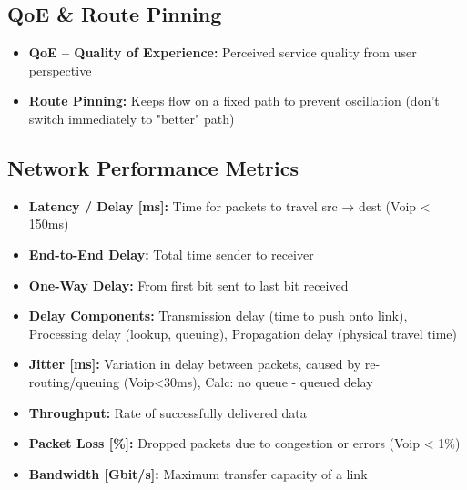 \begin{multicols*}{5}
		\subsection{QoE \& Route Pinning}
		\begin{itemize}
			\item \textbf{QoE – Quality of Experience:} Perceived service quality from user perspective
			\item \textbf{Route Pinning:} Keeps flow on a fixed path to prevent oscillation (don’t switch immediately to "better" path)
		\end{itemize}
		
		\subsection{Network Performance Metrics}
		\begin{itemize}
			\item \textbf{Latency / Delay [ms]:} Time for packets to travel src → dest (Voip < 150ms)
			\item \textbf{End-to-End Delay:} Total time sender to receiver
			\item \textbf{One-Way Delay:} From first bit sent to last bit received
			\item \textbf{Delay Components:} 
			Transmission delay (time to push onto link), 
			Processing delay (lookup, queuing), 
			Propagation delay (physical travel time)
			\item \textbf{Jitter [ms]:} Variation in delay between packets, caused by re-routing/queuing (Voip<30ms), Calc: no queue - queued delay 
			\item \textbf{Throughput:} Rate of successfully delivered data
			\item \textbf{Packet Loss [\%]:} Dropped packets due to congestion or errors (Voip < 1\%)
			\item \textbf{Bandwidth [Gbit/s]:} Maximum transfer capacity of a link
		\end{itemize}
		

\end{multicols*}
